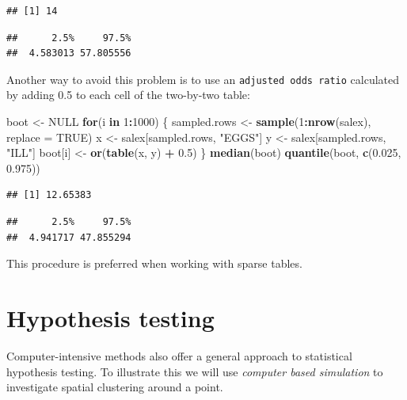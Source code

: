 \documentclass[12pt,a4paper]{book}
\newenvironment{Shaded}{\begin{snugshade}}{\end{snugshade}}
\newcommand{\ControlFlowTok}[1]{\textcolor[rgb]{0.13,0.29,0.53}{\textbf{#1}}}
\newcommand{\DataTypeTok}[1]{\textcolor[rgb]{0.13,0.29,0.53}{#1}}
\newcommand{\DecValTok}[1]{\textcolor[rgb]{0.00,0.00,0.81}{#1}}
\newcommand{\FloatTok}[1]{\textcolor[rgb]{0.00,0.00,0.81}{#1}}
\newcommand{\KeywordTok}[1]{\textcolor[rgb]{0.13,0.29,0.53}{\textbf{#1}}}
\newcommand{\NormalTok}[1]{#1}
\newcommand{\OperatorTok}[1]{\textcolor[rgb]{0.81,0.36,0.00}{\textbf{#1}}}
\newcommand{\OtherTok}[1]{\textcolor[rgb]{0.56,0.35,0.01}{#1}}
\newcommand{\StringTok}[1]{\textcolor[rgb]{0.31,0.60,0.02}{#1}}
\theoremstyle{definition}
\theoremstyle{definition}
\theoremstyle{definition}
\theoremstyle{remark}
\begin{document}
\begin{verbatim}
## [1] 14
\end{verbatim}

\begin{verbatim}
##      2.5%     97.5% 
##  4.583013 57.805556
\end{verbatim}

Another way to avoid this problem is to use an
\texttt{adjusted\ odds\ ratio} calculated by adding 0.5 to each cell of
the two-by-two table:

\begin{Shaded}
\begin{Highlighting}[]
\NormalTok{boot <-}\StringTok{ }\OtherTok{NULL}
\ControlFlowTok{for}\NormalTok{(i }\ControlFlowTok{in} \DecValTok{1}\OperatorTok{:}\DecValTok{1000}\NormalTok{) \{}
\NormalTok{  sampled.rows <-}\StringTok{ }\KeywordTok{sample}\NormalTok{(}\DecValTok{1}\OperatorTok{:}\KeywordTok{nrow}\NormalTok{(salex), }\DataTypeTok{replace =} \OtherTok{TRUE}\NormalTok{)}
\NormalTok{  x <-}\StringTok{ }\NormalTok{salex[sampled.rows, }\StringTok{"EGGS"}\NormalTok{]}
\NormalTok{  y <-}\StringTok{ }\NormalTok{salex[sampled.rows, }\StringTok{"ILL"}\NormalTok{]}
\NormalTok{  boot[i] <-}\StringTok{ }\KeywordTok{or}\NormalTok{(}\KeywordTok{table}\NormalTok{(x, y) }\OperatorTok{+}\StringTok{ }\FloatTok{0.5}\NormalTok{)}
\NormalTok{  \}}
\KeywordTok{median}\NormalTok{(boot)}
\KeywordTok{quantile}\NormalTok{(boot, }\KeywordTok{c}\NormalTok{(}\FloatTok{0.025}\NormalTok{, }\FloatTok{0.975}\NormalTok{))}
\end{Highlighting}
\end{Shaded}

\begin{verbatim}
## [1] 12.65383
\end{verbatim}

\begin{verbatim}
##      2.5%     97.5% 
##  4.941717 47.855294
\end{verbatim}

This procedure is preferred when working with sparse tables.

\hypertarget{hypothesis-testing}{%
\section{Hypothesis testing}\label{hypothesis-testing}}

Computer-intensive methods also offer a general approach to statistical
hypothesis testing. To illustrate this we will use \emph{computer based
simulation} to investigate spatial clustering around a point.
\end{document}

